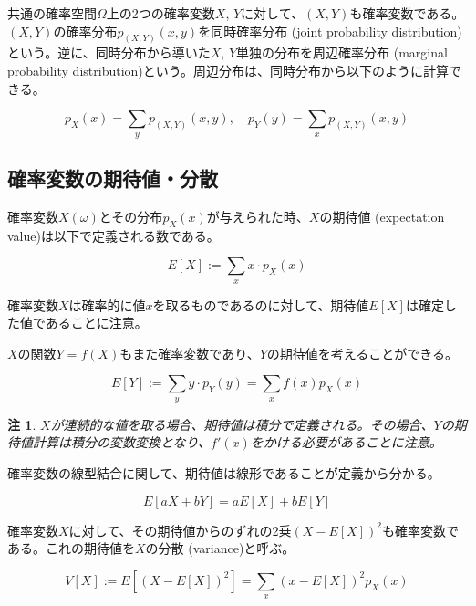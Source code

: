\documentclass[uplatex,dvipdfmx]{jlreq}
\newcommand\term[1]{\textsf{#1}}
\newtheorem{note}{注}
\begin{document}
共通の確率空間$\Omega$上の2つの確率変数$X$, $Y$に対して、$(X, Y)$も確率変数である。$(X, Y)$の確率分布$p_{(X, Y)}(x, y)$を\term{同時確率分布 (joint probability distribution)}という。逆に、同時分布から導いた$X$, $Y$単独の分布を\term{周辺確率分布 (marginal probability distribution)}という。周辺分布は、同時分布から以下のように計算できる。

\begin{equation}
    p_X(x) = \sum_y p_{(X, Y)}(x, y),\quad
    p_Y(y) = \sum_x p_{(X, Y)}(x, y)
\end{equation}

\subsection{確率変数の期待値・分散}

確率変数$X(\omega)$とその分布$p_X(x)$が与えられた時、$X$の\term{期待値 (expectation value)}は以下で定義される数である。

\begin{equation}
    E[X] := \sum_x x \cdot p_X(x)
\end{equation}

確率変数$X$は確率的に値$x$を取るものであるのに対して、期待値$E[X]$は確定した値であることに注意。

$X$の関数$Y=f(X)$もまた確率変数であり、$Y$の期待値を考えることができる。

\begin{equation}
    E[Y] := \sum_y y \cdot p_Y(y) = \sum_x f(x)p_X(x)
\end{equation}

\begin{note}
    $X$が連続的な値を取る場合、期待値は積分で定義される。その場合、$Y$の期待値計算は積分の変数変換となり、$f'(x)$をかける必要があることに注意。
\end{note}

確率変数の線型結合に関して、期待値は線形であることが定義から分かる。

\begin{equation}
    E[aX + bY] = aE[X] + bE[Y]
\end{equation}

確率変数$X$に対して、その期待値からのずれの2乗$(X-E[X])^2$も確率変数である。これの期待値を$X$の\term{分散 (variance)}と呼ぶ。

\begin{equation}
    V[X] := E[(X-E[X])^2] = \sum_x (x-E[X])^2 p_X(x)
\end{equation}
\end{document}
